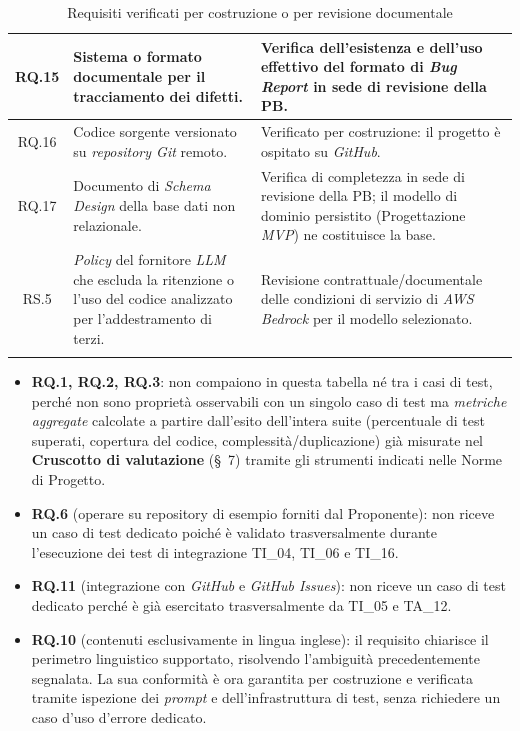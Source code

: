 \documentclass[12pt, a4paper]{article}
\begin{document}
\begin{xltabular}{\textwidth}{|c|X|X|}
    RQ.15 & Sistema o formato documentale per il tracciamento dei difetti. & Verifica dell'esistenza e dell'uso effettivo del formato di \textit{Bug Report} in sede di revisione della PB. \\ \hline

    RQ.16 & Codice sorgente versionato su \textit{repository Git} remoto. & Verificato per costruzione: il progetto è ospitato su \textit{GitHub}. \\ \hline

    RQ.17 & Documento di \textit{Schema Design} della base dati non relazionale. & Verifica di completezza in sede di revisione della PB; il modello di dominio persistito (Progettazione \textit{MVP}) ne costituisce la base. \\ \hline

    RS.5 & \textit{Policy} del fornitore \textit{LLM} che escluda la ritenzione o l'uso del codice analizzato per l'addestramento di terzi. & Revisione contrattuale/documentale delle condizioni di servizio di \textit{AWS Bedrock} per il modello selezionato. \\ \hline

    \caption{Requisiti verificati per costruzione o per revisione documentale}
    \label{tab:requisiti_per_costruzione}
\end{xltabular}

\begin{itemize}
    \item \textbf{RQ.1, RQ.2, RQ.3}: non compaiono in questa tabella né tra i casi di test, perché non sono proprietà osservabili con un singolo caso di test ma \textit{metriche aggregate} calcolate a partire dall'esito dell'intera suite (percentuale di test superati, copertura del codice, complessità/duplicazione) già misurate nel \textbf{Cruscotto di valutazione} (\S~7) tramite gli strumenti indicati nelle Norme di Progetto.
    \item \textbf{RQ.6} (operare su repository di esempio forniti dal Proponente): non riceve un caso di test dedicato poiché è validato trasversalmente durante l'esecuzione dei test di integrazione TI\_04, TI\_06 e TI\_16.
    \item \textbf{RQ.11} (integrazione con \textit{GitHub} e \textit{GitHub Issues}): non riceve un caso di test dedicato perché è già esercitato trasversalmente da TI\_05 e TA\_12.
    \item \textbf{RQ.10} (contenuti esclusivamente in lingua inglese): il requisito chiarisce il perimetro linguistico supportato, risolvendo l'ambiguità precedentemente segnalata. La sua conformità è ora garantita per costruzione e verificata tramite ispezione dei \textit{prompt} e dell'infrastruttura di test, senza richiedere un caso d'uso d'errore dedicato.
\end{itemize}
\end{document}
